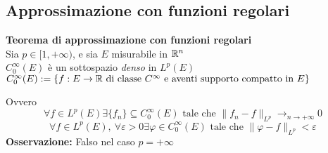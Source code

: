 \subsection{Approssimazione con funzioni regolari}
\begin{tcolorbox}
	\textbf{Teorema di approssimazione con funzioni regolari}\\
	Sia $p\in[1,+\infty)$, e sia $E$ misurabile in $\mathbb{R}^n$
	\\$C_0^\infty(E)$ è un sottospazio \textit{denso} in $L^p(E)$
	\\$C_0^\infty(E):=\{f:E\to \mathbb{R}\text{ di classe }C^\infty \text{ e aventi supporto compatto in }E\}$ 
\end{tcolorbox}
Ovvero 
\[\forall f\in L^p(E) \exists \{f_n\} \subseteq C_0^\infty(E)\text{ tale che }\|f_n-f\|_{L^p}\to_{n\to +\infty}0\]
\[\forall f\in L^p(E),\ \forall \varepsilon>0 \exists \varphi\in C_0^\infty(E)\text{ tale che }\|\varphi-f\|_{L^p}<\varepsilon\]
\textbf{Osservazione:} Falso nel caso $p=+\infty$


